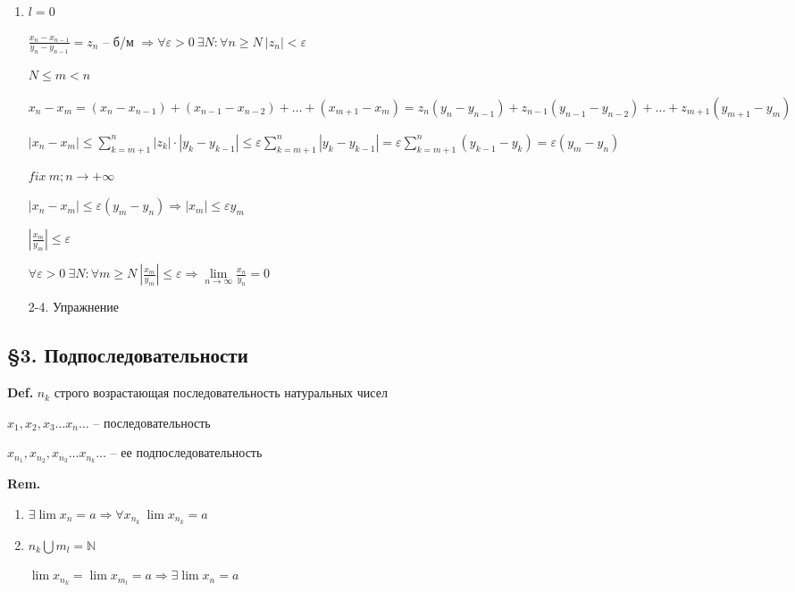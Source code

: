 \documentclass[14pt, letter paper]{article}
\begin{document}
\begin{enumerate}
    \item $l = 0$

    $\frac{x_n-x_{n-1}}{y_n-y_{n-1}} = z_n$ -- б/м $\Rightarrow \forall \varepsilon > 0\ \exists N : \forall n \geq N\ |z_n| < \varepsilon$

    $N \leq m < n$

    $x_n - x_m = (x_n-x_{n-1}) + (x_{n-1} - x_{n-2}) + \ldots + (x_{m+1} - x_m) = z_n(y_n - y_{n-1}) + z_{n-1}(y_{n-1}-y_{n-2}) + \ldots + z_{m+1}(y_{m+1} - y_m)$

    $|x_n - x_m| \leq \sum\limits_{k=m+1}^n |z_k| \cdot |y_k - y_{k-1}| \leq \varepsilon \sum\limits_{k=m+1}^n |y_k - y_{k-1}| = \varepsilon \sum\limits_{k=m+1}^n(y_{k-1} - y_k) = \varepsilon(y_m - y_n)$

    $fix\ m; n \rightarrow + \infty$

    $|x_n - x_m| \leq \varepsilon (y_m - y_n) \Rightarrow |x_m| \leq \varepsilon y_m$

    $|\frac{x_m}{y_m}| \leq \varepsilon$

    $\forall \varepsilon > 0\ \exists N : \forall m \geq N\ |\frac{x_m}{y_m}| \leq \varepsilon \Rightarrow \lim\limits_{n \rightarrow \infty}{\frac{x_n}{y_n}} = 0$

    \item[2-4.] Упражнение
\end{enumerate}

\begin{center}
    \subsection*{\S 3. Подпоследовательности}
\end{center}

\textbf{Def.} $n_k$ строго возрастающая последовательность натуральных чисел

$x_1, x_2, x_3 \ldots x_n \ldots$ -- последовательность

$x_{n_1}, x_{n_2}, x_{n_3} \ldots x_{n_k} \ldots$ -- ее подпоследовательность

\textbf{Rem.}

\begin{enumerate}
    \item $\exists \lim{x_n} = a \Rightarrow \forall x_{n_k}\ \lim{x_{n_k}} = a$
    \item $n_k \bigcup m_l = \mathds{N}$

    $\lim{x_{n_k}} = \lim{x_{m_l}} = a \Rightarrow \exists \lim{x_n} = a$
\end{enumerate}
\end{document}
